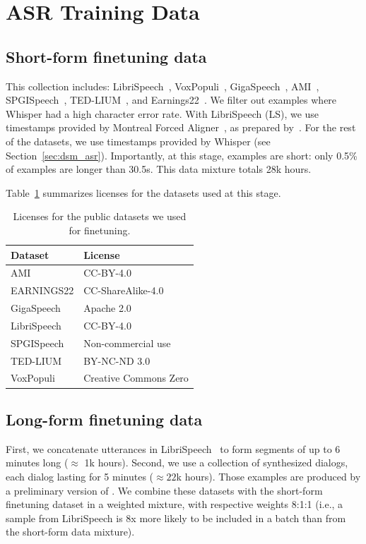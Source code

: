 \appendix

\section{ASR Training Data}
\label{sec:app:data}
\subsection{Short-form finetuning data}
\label{sec:app:short-form}
This collection includes: LibriSpeech~\citep{librispeech}, VoxPopuli~\citep{voxpopuli}, GigaSpeech~\citep{gigaspeech}, AMI~\cite{ami-carletta2007,ami-renals2007}, SPGISpeech~\citep{spgispeech}, TED-LIUM~\citep{tedlium}, and Earnings22~\citep{earnings22}.
We filter out examples where Whisper had a high character error rate. %
With LibriSpeech (LS), we use timestamps provided by Montreal Forced Aligner~\citep{montreal_forced_aligner}, as prepared by~\cite{lugosch2019}. For the rest of the datasets, we use timestamps provided by Whisper (see Section~\ref{sec:dsm_asr}). Importantly, at this stage, examples are short: only 0.5\% of examples are longer than 30.5s. This data mixture totals 28k hours.

Table~\ref{tab:license_asr} summarizes licenses for the datasets used at this stage.

\begin{table}[h]
    \centering
\begin{tabular}{ll}
\toprule
\textbf{Dataset} & \textbf{License} \\
\midrule
AMI & CC-BY-4.0 \\
EARNINGS22 & CC-ShareAlike-4.0 \\
GigaSpeech & Apache 2.0 \\
LibriSpeech & CC-BY-4.0 \\
SPGISpeech & Non-commercial use \\
TED-LIUM & BY-NC-ND 3.0 \\
VoxPopuli & Creative Commons Zero \\
\bottomrule
\end{tabular}
    \caption{Licenses for the public datasets we used for \oursASR{} finetuning.}
    \label{tab:license_asr}
\end{table}
\subsection{Long-form finetuning data}
\label{sec:app:long-form}
First, we concatenate utterances in LibriSpeech~\citep{librispeech} to form segments of up to 6 minutes long ($\approx$ 1k hours). %
Second, we use a collection of synthesized dialogs, each dialog lasting for 5 minutes ($\approx 22$k hours). Those examples are produced by a preliminary version of \oursTTS. %
We combine these datasets with the short-form finetuning dataset in a weighted mixture, with respective weights 8:1:1 (i.e., a sample from LibriSpeech is 8x more likely to be included in a batch than from the short-form data mixture).


